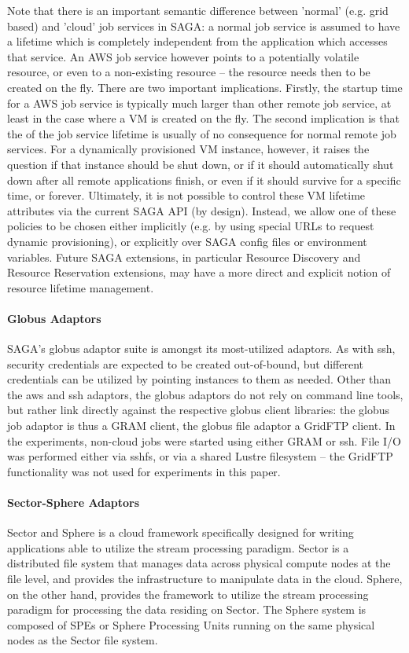 \documentclass[3p,twocolumn]{elsarticle}
\begin{document}
Note that there is an important semantic difference between 'normal'
(e.g. grid based) and 'cloud' job services in SAGA: a normal job
service is assumed to have a lifetime which is completely independent
from the application which accesses that service.  An AWS job service
however points to a potentially volatile resource, or even to a
non-existing resource -- the resource needs then to be created on the
fly.  There are two important implications.  Firstly, the startup time
for a AWS job service is typically much larger than other remote job
service, at least in the case where a VM is created on the fly.  The
second implication is that the  of the job service lifetime is
usually of no consequence for normal remote job services.  For a
dynamically provisioned VM instance, however, it raises the question
if that instance should be shut down, or if it should automatically
shut down after all remote applications finish, or even if it should
survive for a specific time, or forever.  Ultimately, it is not
possible to control these VM lifetime attributes via the current SAGA
API (by design).  Instead, we allow one of these policies to be chosen
either implicitly (e.g. by using special URLs to request dynamic
provisioning), or explicitly over SAGA config files or environment
variables.  Future SAGA extensions, in particular Resource Discovery
and Resource Reservation extensions, may have a more direct and
explicit notion of resource lifetime management.


\paragraph{Globus Adaptors}

SAGA's globus adaptor suite is amongst its most-utilized adaptors.  As
with ssh, security credentials are expected to be created
out-of-bound, but different credentials can be utilized by pointing
 instances to them as needed.  Other than the aws and
ssh adaptors, the globus adaptors do not rely on command line tools,
but rather link directly against the respective globus client
libraries: the globus job adaptor is thus a GRAM client, the globus
file adaptor a GridFTP client.  In the experiments, non-cloud jobs
were started using either GRAM or ssh.  File I/O was performed either
via sshfs, or via a shared Lustre filesystem -- the GridFTP
functionality was not used for experiments in this paper.

\paragraph{Sector-Sphere Adaptors}
Sector and Sphere is a cloud framework specifically designed for
writing applications able to utilize the stream processing
paradigm. Sector is a distributed file system that manages data across
physical compute nodes at the file level, and provides the
infrastructure to manipulate data in the cloud. Sphere, on the other
hand, provides the framework to utilize the stream processing paradigm
for processing the data residing on Sector. The Sphere system is
composed of SPEs or Sphere Processing Units running on the same
physical nodes as the Sector file system.
\end{document}
